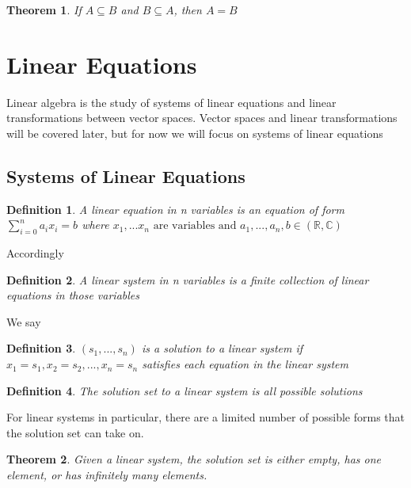 \documentclass{article}
\newtheorem{theorem}{Theorem}
\newtheorem{definition}{Definition}
\begin{document}
    \begin{theorem}
        If $A \subseteq B$ and $B \subseteq A$, then $A = B$
    \end{theorem}

    \section{Linear Equations}
    Linear algebra is the study of systems of linear equations and linear transformations between vector spaces.
    Vector spaces and linear transformations will be covered later, but for now we will focus on systems of linear equations
    \subsection{Systems of Linear Equations}
    \begin{definition}
        A linear equation in n variables is an equation of form $\sum_{i=0}^{n}{a_ix_i} = b$ where $x_1,...x_n \text{ are variables and } a_1,...,a_n, b \in (\mathbb{R}, \mathbb{C})$
    \end{definition}
    Accordingly
    \begin{definition}
        A linear system in n variables is a finite collection of linear equations in those variables
    \end{definition}
    We say
    \begin{definition}
        $(s_1,...,s_n)$ is a solution to a linear system if $x_1=s_1, x_2=s_2, ..., x_n=s_n$ satisfies each equation in the linear system
    \end{definition}
    \begin{definition}
        The solution set to a linear system is all possible solutions
    \end{definition}
    For linear systems in particular, there are a limited number of possible forms that the solution set can take on.
    \begin{theorem}
        Given a linear system, the solution set is either empty, has one element, or has infinitely many elements.
    \end{theorem}
\end{document}
